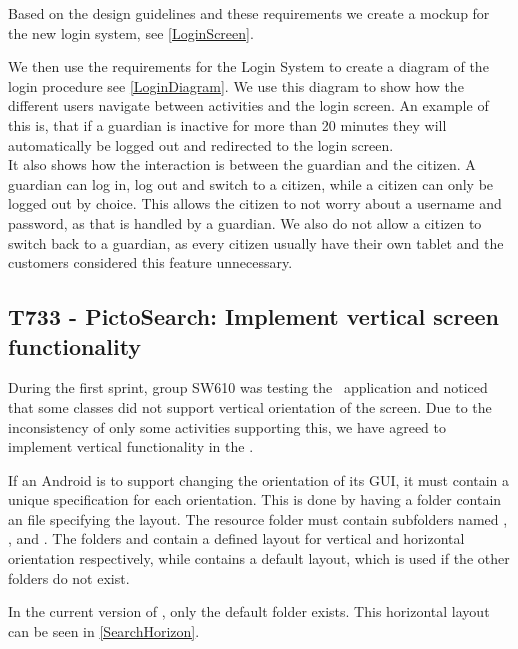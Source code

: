 Based on the design guidelines \cite{DesignManual} and these requirements we
create a mockup for the new login system, see \autoref{LoginScreen}.


We then use the requirements for the Login System to create a diagram of the
login procedure see \autoref{LoginDiagram}. We use this diagram to show how the
different users navigate between activities and the login
screen. An example of this is, that if a guardian is inactive for more
than 20 minutes they will automatically be logged out and redirected to the login screen.\\
It also shows how the interaction is between the guardian and the citizen. A
guardian can log in, log out and switch to a citizen, while a citizen can only
be logged out by choice. This allows the citizen to not worry about a username
and password, as that is handled by a guardian. We also do not allow a citizen
to switch back to a guardian, as every citizen usually have their own tablet
and the customers considered this feature unnecessary.


\subsection{T733 - PictoSearch: Implement vertical screen functionality}
During the first sprint, group SW610 was testing the \wapp\ application and
noticed that some  classes did not support vertical orientation of
the screen.
Due to the inconsistency of only some activities supporting this, we have agreed
to implement vertical functionality in the \plib.\nl

If an Android  is to support changing the orientation of its GUI,
it must contain a unique specification for each orientation. This is done by
having a folder contain an  file specifying the layout. The resource
folder  must contain subfolders named ,
, and . The folders 
and  contain a defined layout for vertical and horizontal
orientation respectively, while  contains a default layout, which
is used if the other folders do not exist.\nl

In the current version of \plib, only the default folder
 exists. This horizontal layout can be seen in
\autoref{SearchHorizon}.

